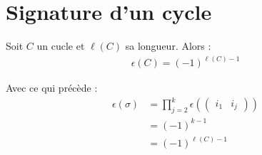 \documentclass[../main.tex]{subfiles}
\begin{document}
\section{Signature d'un cycle}
\begin{tcolorbox}[title=Propostion 28.63, title filled=false, colframe=lightblue, colback=lightblue!10!white]
    Soit $C$ un cucle et $\ell(C)$ sa longueur. Alors : 
    \begin{align*}
        \epsilon(C) = (-1)^{\ell(C) - 1}
    \end{align*}
\end{tcolorbox}

\noindent Avec ce qui précède : 
\begin{align*}
    \epsilon(\sigma) &= \prod_{j=2}^{k} \epsilon(\begin{pmatrix}
        i_1 & i_j
    \end{pmatrix}) \\
    &= (-1)^{k-1} \\
    &= (-1)^{\ell(C) - 1}
\end{align*}
\end{document}
